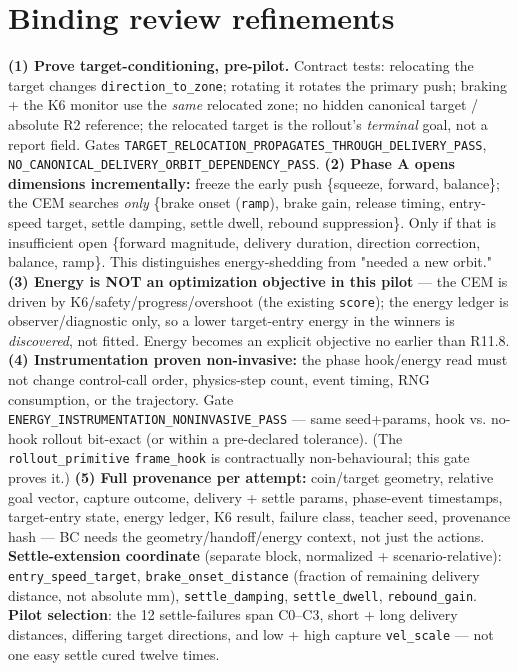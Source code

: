 \documentclass[11pt]{article}
\newcommand{\code}[1]{\texttt{\small #1}}
\newcommand{\gate}[1]{\textcolor{blue!55!black}{\texttt{\small #1}}}
\begin{document}
\section{Binding review refinements}
\textbf{(1) Prove target-conditioning, pre-pilot.} Contract tests: relocating the target changes
\code{direction\_to\_zone}; rotating it rotates the primary push; braking + the K6 monitor use the \emph{same} relocated
zone; no hidden canonical target / absolute R2 reference; the relocated target is the rollout's \emph{terminal} goal, not
a report field. Gates \gate{TARGET\_RELOCATION\_PROPAGATES\_THROUGH\_DELIVERY\_PASS},
\gate{NO\_CANONICAL\_DELIVERY\_ORBIT\_DEPENDENCY\_PASS}. \textbf{(2) Phase A opens dimensions incrementally:} freeze the
early push \{squeeze, forward, balance\}; the CEM searches \emph{only} \{brake onset (\code{ramp}), brake gain, release
timing, entry-speed target, settle damping, settle dwell, rebound suppression\}. Only if that is insufficient open
\{forward magnitude, delivery duration, direction correction, balance, ramp\}. This distinguishes energy-shedding from
"needed a new orbit." \textbf{(3) Energy is NOT an optimization objective in this pilot} --- the CEM is driven by
K6/safety/progress/overshoot (the existing \code{score}); the energy ledger is observer/diagnostic only, so a lower
target-entry energy in the winners is \emph{discovered}, not fitted. Energy becomes an explicit objective no earlier than
R11.8. \textbf{(4) Instrumentation proven non-invasive:} the phase hook/energy read must not change control-call order,
physics-step count, event timing, RNG consumption, or the trajectory. Gate
\gate{ENERGY\_INSTRUMENTATION\_NONINVASIVE\_PASS} --- same seed+params, hook vs. no-hook rollout bit-exact (or within a
pre-declared tolerance). (The \code{rollout\_primitive} \code{frame\_hook} is contractually non-behavioural; this gate
proves it.) \textbf{(5) Full provenance per attempt:} coin/target geometry, relative goal vector, capture outcome,
delivery + settle params, phase-event timestamps, target-entry state, energy ledger, K6 result, failure class, teacher
seed, provenance hash --- BC needs the geometry/handoff/energy context, not just the actions. \textbf{Settle-extension
coordinate} (separate block, normalized + scenario-relative): \code{entry\_speed\_target}, \code{brake\_onset\_distance}
(fraction of remaining delivery distance, not absolute mm), \code{settle\_damping}, \code{settle\_dwell},
\code{rebound\_gain}. \textbf{Pilot selection}: the 12 settle-failures span C0--C3, short + long delivery distances,
differing target directions, and low + high capture \code{vel\_scale} --- not one easy settle cured twelve times.
\end{document}
